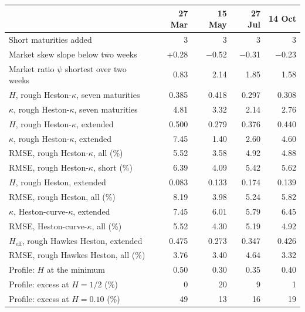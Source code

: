 \begin{tabular}{lrrrr}
\toprule
 & 27 Mar & 15 May & 27 Jul & 14 Oct\\
\midrule
Short maturities added & 3 & 3 & 3 & 3\\
Market skew slope below two weeks & +0.28 & $-$0.52 & $-$0.31 & $-$0.23\\
Market ratio $\psi$ shortest over two weeks & 0.83 & 2.14 & 1.85 & 1.58\\
\addlinespace
$H$, rough Heston-$\kappa$, seven maturities & 0.385 & 0.418 & 0.297 & 0.308\\
$\kappa$, rough Heston-$\kappa$, seven maturities & 4.81 & 3.32 & 2.14 & 2.76\\
\addlinespace
$H$, rough Heston-$\kappa$, extended & 0.500 & 0.279 & 0.376 & 0.440\\
$\kappa$, rough Heston-$\kappa$, extended & 7.45 & 1.40 & 2.60 & 4.60\\
RMSE, rough Heston-$\kappa$, all (\%) & 5.52 & 3.58 & 4.92 & 4.88\\
RMSE, rough Heston-$\kappa$, short (\%) & 6.39 & 4.09 & 5.42 & 5.62\\
\addlinespace
$H$, rough Heston, extended & 0.083 & 0.133 & 0.174 & 0.139\\
RMSE, rough Heston, all (\%) & 8.19 & 3.98 & 5.24 & 5.82\\
$\kappa$, Heston-curve-$\kappa$, extended & 7.45 & 6.01 & 5.79 & 6.45\\
RMSE, Heston-curve-$\kappa$, all (\%) & 5.52 & 4.30 & 5.19 & 4.92\\
$H_{\mathrm{eff}}$, rough Hawkes Heston, extended & 0.475 & 0.273 & 0.347 & 0.426\\
RMSE, rough Hawkes Heston, all (\%) & 3.76 & 3.40 & 4.64 & 3.32\\
\addlinespace
Profile: $H$ at the minimum & 0.50 & 0.30 & 0.35 & 0.40\\
Profile: excess at $H = 1/2$ (\%) & 0 & 20 & 9 & 1\\
Profile: excess at $H = 0.10$ (\%) & 49 & 13 & 16 & 19\\
\bottomrule
\end{tabular}
